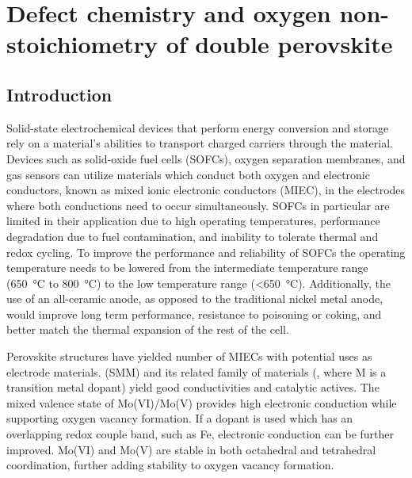
\chapter[Defect chemistry and oxygen non-stoichiometry of \ce{SrFe_{0.2}Co_{0.4}Mo_{0.4}O_{3-\delta}}]{Defect chemistry and oxygen non-stoichiometry of double perovskite }

\section{Introduction}
    Solid-state electrochemical devices that perform energy conversion and storage rely on a material's abilities to transport charged carriers through the material.
    Devices such as solid-oxide fuel cells (SOFCs), oxygen separation membranes, and gas sensors can utilize materials which conduct both oxygen and electronic conductors, known as mixed ionic electronic conductors (MIEC), in the electrodes where both conductions need to occur simultaneously.\cite{Huang2006}
    SOFCs in particular are limited in their application due to high operating temperatures, performance degradation due to fuel contamination, and inability to tolerate thermal and redox cycling.
    To improve the performance and reliability of SOFCs the operating temperature needs to be lowered from the intermediate temperature range (\SI{650}{\celsius} to \SI{800}{\celsius}) to the low temperature range (\textless\SI{650}{\celsius}).\cite{Wachsman2011a}
    Additionally, the use of an all-ceramic anode, as opposed to the traditional nickel metal anode, would improve long term performance, resistance to poisoning or coking, and better match the thermal expansion of the rest of the cell.\cite{Goodenough2007}

    Perovskite structures have yielded number of MIECs with potential uses as electrode materials. \cite{Yamamoto1987,Anderson1992,Ishihara2009}
     (SMM) and its related family of materials (, where M is a transition metal dopant) yield good conductivities and catalytic actives.\cite{Huang2009}
    The mixed valence state of Mo(VI)/Mo(V) provides high electronic conduction while supporting oxygen vacancy formation.\cite{Huang2006a}
    If a dopant is used which has an overlapping redox couple band, such as Fe, electronic conduction can be further improved.
    Mo(VI) and Mo(V) are stable in both octahedral and tetrahedral coordination, further adding stability to oxygen vacancy formation.\cite{Bernuy-Lopez2007}


